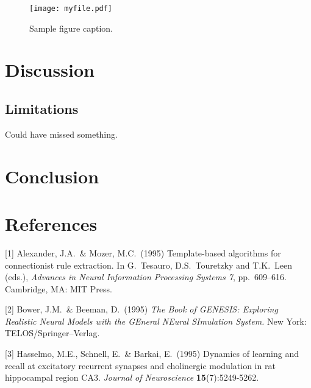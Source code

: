 \documentclass{article}
\begin{document}
\begin{figure}
  \centering
   \texttt{[image: myfile.pdf]}
  \caption{Sample figure caption.}
\end{figure}

\section{Discussion}

\subsection{Limitations}
Could have missed something.

\section{Conclusion}


\section*{References}

[1] Alexander, J.A.\ \& Mozer, M.C.\ (1995) Template-based algorithms for
connectionist rule extraction. In G.\ Tesauro, D.S.\ Touretzky and T.K.\ Leen
(eds.), {\it Advances in Neural Information Processing Systems 7},
pp.\ 609--616. Cambridge, MA: MIT Press.

[2] Bower, J.M.\ \& Beeman, D.\ (1995) {\it The Book of GENESIS: Exploring
  Realistic Neural Models with the GEneral NEural SImulation System.}  New York:
TELOS/Springer--Verlag.

[3] Hasselmo, M.E., Schnell, E.\ \& Barkai, E.\ (1995) Dynamics of learning and
recall at excitatory recurrent synapses and cholinergic modulation in rat
hippocampal region CA3. {\it Journal of Neuroscience} {\bf 15}(7):5249-5262.
\end{document}
